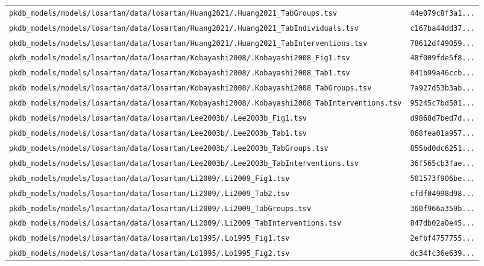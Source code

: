\documentclass{article}
\begin{document}
\begin{longtable}{ll}
\texttt{pkdb\_models/models/losartan/data/losartan/Huang2021/.Huang2021\_TabGroups.tsv} & \texttt{44e079c8f3a1...} \\
\texttt{pkdb\_models/models/losartan/data/losartan/Huang2021/.Huang2021\_TabIndividuals.tsv} & \texttt{c167ba44dd37...} \\
\texttt{pkdb\_models/models/losartan/data/losartan/Huang2021/.Huang2021\_TabInterventions.tsv} & \texttt{78612df49059...} \\
\texttt{pkdb\_models/models/losartan/data/losartan/Kobayashi2008/.Kobayashi2008\_Fig1.tsv} & \texttt{48f009fde5f8...} \\
\texttt{pkdb\_models/models/losartan/data/losartan/Kobayashi2008/.Kobayashi2008\_Tab1.tsv} & \texttt{841b99a46ccb...} \\
\texttt{pkdb\_models/models/losartan/data/losartan/Kobayashi2008/.Kobayashi2008\_TabGroups.tsv} & \texttt{7a927d53b3ab...} \\
\texttt{pkdb\_models/models/losartan/data/losartan/Kobayashi2008/.Kobayashi2008\_TabInterventions.tsv} & \texttt{95245c7bd501...} \\
\texttt{pkdb\_models/models/losartan/data/losartan/Lee2003b/.Lee2003b\_Fig1.tsv} & \texttt{d9868d7bed7d...} \\
\texttt{pkdb\_models/models/losartan/data/losartan/Lee2003b/.Lee2003b\_Tab1.tsv} & \texttt{068fea01a957...} \\
\texttt{pkdb\_models/models/losartan/data/losartan/Lee2003b/.Lee2003b\_TabGroups.tsv} & \texttt{855bd0dc6251...} \\
\texttt{pkdb\_models/models/losartan/data/losartan/Lee2003b/.Lee2003b\_TabInterventions.tsv} & \texttt{36f565cb3fae...} \\
\texttt{pkdb\_models/models/losartan/data/losartan/Li2009/.Li2009\_Fig1.tsv} & \texttt{501573f906be...} \\
\texttt{pkdb\_models/models/losartan/data/losartan/Li2009/.Li2009\_Tab2.tsv} & \texttt{cfdf04998d98...} \\
\texttt{pkdb\_models/models/losartan/data/losartan/Li2009/.Li2009\_TabGroups.tsv} & \texttt{360f966a359b...} \\
\texttt{pkdb\_models/models/losartan/data/losartan/Li2009/.Li2009\_TabInterventions.tsv} & \texttt{847db02a0e45...} \\
\texttt{pkdb\_models/models/losartan/data/losartan/Lo1995/.Lo1995\_Fig1.tsv} & \texttt{2efbf4757755...} \\
\texttt{pkdb\_models/models/losartan/data/losartan/Lo1995/.Lo1995\_Fig2.tsv} & \texttt{dc34fc36e639...} \\

\end{longtable}
\end{document}
